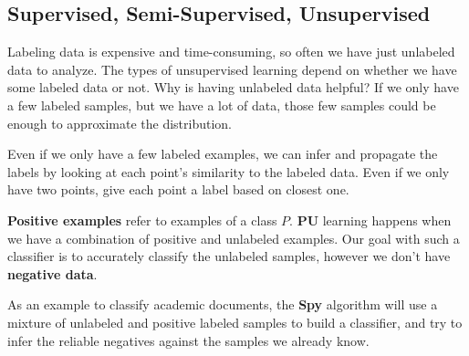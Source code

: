 \documentclass[
  paper=a4,
,captions=tableheading
]{scrartcl}
\begin{document}
\hypertarget{supervised-semi-supervised-unsupervised}{%
\subsection{Supervised, Semi-Supervised,
Unsupervised}\label{supervised-semi-supervised-unsupervised}}

Labeling data is expensive and time-consuming, so often we have just
unlabeled data to analyze. The types of unsupervised learning depend on
whether we have some labeled data or not. Why is having unlabeled data
helpful? If we only have a few labeled samples, but we have a lot of
data, those few samples could be enough to approximate the distribution.

Even if we only have a few labeled examples, we can infer and propagate
the labels by looking at each point's similarity to the labeled data.
Even if we only have two points, give each point a label based on
closest one.

\textbf{Positive examples} refer to examples of a class \(P\).
\textbf{PU} learning happens when we have a combination of positive and
unlabeled examples. Our goal with such a classifier is to accurately
classify the unlabeled samples, however we don't have \textbf{negative
data}.

As an example to classify academic documents, the \textbf{Spy} algorithm
will use a mixture of unlabeled and positive labeled samples to build a
classifier, and try to infer the reliable negatives against the samples
we already know.
\end{document}
